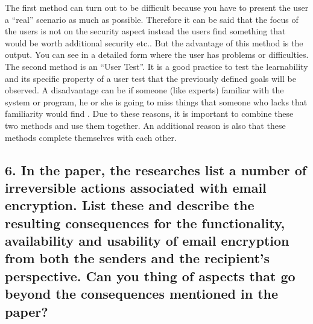 The first method can turn out to be difficult because you have to present the user a “real” scenario as much as possible. Therefore it can be said that the focus of the users is not on the security aspect instead the users find something that would be worth additional security etc.. But the advantage of this method is the output. You can see in a detailed form where the user has problems or difficulties.
The second method is an “User Test”. It is a good practice to test the learnability and its specific property of a user test that the previously defined goals will be observed. A disadvantage can be if someone (like experts) familiar with the system or program, he or she is going to miss things that someone who lacks that familiarity would find .
Due to these reasons, it is important to combine these two methods and use them together. An additional reason is also that these methods complete themselves with each other. 

\subsection{6. In the paper, the researches list a number of irreversible actions associated with email encryption. List these and describe the resulting consequences for the functionality, availability and usability of email encryption from both the senders and the recipient’s perspective. Can you thing of aspects that go beyond the consequences mentioned in the paper?}

